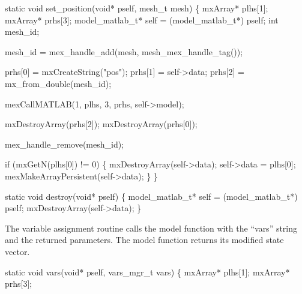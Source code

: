 \nwendcode{}\nwdocspar

\nwenddocs{}\plusendmoddef
static void set_position(void* pself, mesh_t mesh)
\{
    mxArray* plhs[1];
    mxArray* prhs[3];
    model_matlab_t* self = (model_matlab_t*) pself;
    int mesh_id;

    mesh_id = mex_handle_add(mesh, mesh_mex_handle_tag());

    prhs[0] = mxCreateString("pos");
    prhs[1] = self->data;
    prhs[2] = mx_from_double(mesh_id);

    mexCallMATLAB(1, plhs, 3, prhs, self->model); 

    mxDestroyArray(prhs[2]);
    mxDestroyArray(prhs[0]);

    mex_handle_remove(mesh_id);

    if (mxGetN(plhs[0]) != 0) \{
        mxDestroyArray(self->data);
        self->data = plhs[0];
        mexMakeArrayPersistent(self->data);
    \}
\}

\nwendcode{}\nwdocspar

\nwenddocs{}\plusendmoddef
static void destroy(void* pself)
\{
    model_matlab_t* self = (model_matlab_t*) pself;
    mxDestroyArray(self->data);
\}

\nwendcode{}\nwdocspar

The variable assignment routine calls the model function with the
``vars'' string and the returned parameters.  The model function
returns its modified state vector.

\nwenddocs{}\plusendmoddef
static void vars(void* pself, vars_mgr_t vars)
\{
    mxArray* plhs[1];
    mxArray* prhs[3];

